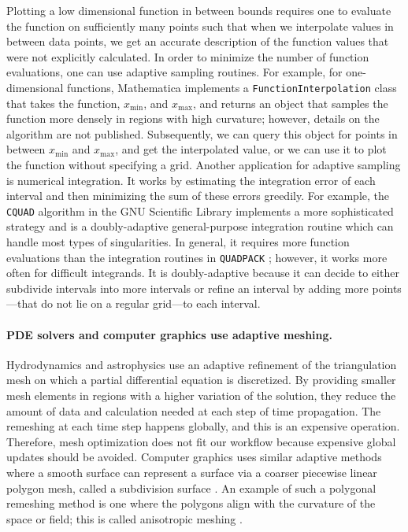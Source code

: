 Plotting a low dimensional function in between bounds requires one to evaluate the function on sufficiently many points such that when we interpolate values in between data points, we get an accurate description of the function values that were not explicitly calculated.
In order to minimize the number of function evaluations, one can use adaptive sampling routines.
For example, for one-dimensional functions, Mathematica \cite{WolframResearch} implements a \passthrough{\lstinline!FunctionInterpolation!} class that takes the function, $x_\textrm{min}$, and $x_\textrm{max}$, and returns an object that samples the function more densely in regions with high curvature; however, details on the algorithm are not published.
Subsequently, we can query this object for points in between $x_\textrm{min}$ and $x_\textrm{max}$, and get the interpolated value, or we can use it to plot the function without specifying a grid.
Another application for adaptive sampling is numerical integration.
It works by estimating the integration error of each interval and then minimizing the sum of these errors greedily.
For example, the \passthrough{\lstinline!CQUAD!} algorithm \cite{Gonnet2010} in the GNU Scientific Library \cite{Galassi1996} implements a more sophisticated strategy and is a doubly-adaptive general-purpose integration routine which can handle most types of singularities.
In general, it requires more function evaluations than the integration routines in \passthrough{\lstinline!QUADPACK!} \cite{Galassi1996}; however, it works more often for difficult integrands.
It is doubly-adaptive because it can decide to either subdivide intervals into more intervals or refine an interval by adding more points---that do not lie on a regular grid---to each interval.

\hypertarget{pde-solvers-and-computer-graphics-use-adaptive-meshing.}{%
\paragraph{PDE solvers and computer graphics use adaptive meshing.}\label{pde-solvers-and-computer-graphics-use-adaptive-meshing.}}

Hydrodynamics \cite{Berger1989, Berger1984} and astrophysics \cite{Klein1999} use an adaptive refinement of the triangulation mesh on which a partial differential equation is discretized.
By providing smaller mesh elements in regions with a higher variation of the solution, they reduce the amount of data and calculation needed at each step of time propagation.
The remeshing at each time step happens globally, and this is an expensive operation.
Therefore, mesh optimization does not fit our workflow because expensive global updates should be avoided.
Computer graphics uses similar adaptive methods where a smooth surface can represent a surface via a coarser piecewise linear polygon mesh, called a subdivision surface \cite{DeRose1998}.
An example of such a polygonal remeshing method is one where the polygons align with the curvature of the space or field; this is called anisotropic meshing \cite{Alliez2003}.

